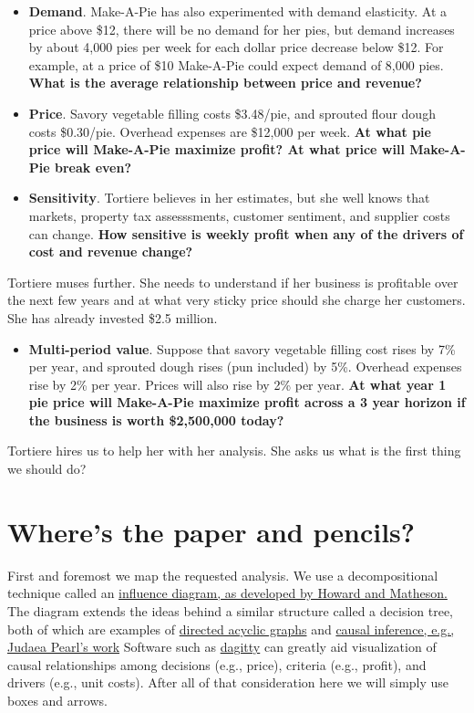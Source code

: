 \documentclass[
]{book}
\providecommand{\tightlist}{%
  \setlength{\itemsep}{0pt}\setlength{\parskip}{0pt}}
\begin{document}
\begin{itemize}
\item
  \textbf{Demand}. Make-A-Pie has also experimented with demand elasticity. At a price above \$12, there will be no demand for her pies, but demand increases by about 4,000 pies per week for each dollar price decrease below \$12. For example, at a price of \$10 Make-A-Pie could expect demand of 8,000 pies. \textbf{What is the average relationship between price and revenue?}
\item
  \textbf{Price}. Savory vegetable filling costs \$3.48/pie, and sprouted flour dough costs \$0.30/pie. Overhead expenses are \$12,000 per week. \textbf{At what pie price will Make-A-Pie maximize profit? At what price will Make-A-Pie break even?}
\item
  \textbf{Sensitivity}. Tortiere believes in her estimates, but she well knows that markets, property tax assesssments, customer sentiment, and supplier costs can change. \textbf{How sensitive is weekly profit when any of the drivers of cost and revenue change?}
\end{itemize}

Tortiere muses further. She needs to understand if her business is profitable over the next few years and at what very sticky price should she charge her customers. She has already invested \$2.5 million.

\begin{itemize}
\tightlist
\item
  \textbf{Multi-period value}. Suppose that savory vegetable filling cost rises by 7\% per year, and sprouted dough rises (pun included) by 5\%. Overhead expenses rise by 2\% per year. Prices will also rise by 2\% per year. \textbf{At what year 1 pie price will Make-A-Pie maximize profit across a 3 year horizon if the business is worth \$2,500,000 today?}
\end{itemize}

Tortiere hires us to help her with her analysis. She asks us what is the first thing we should do?

\hypertarget{wheres-the-paper-and-pencils}{%
\section{Where's the paper and pencils?}\label{wheres-the-paper-and-pencils}}

First and foremost we map the requested analysis. We use a decompositional technique called an \href{http://www.cs.ru.nl/~marinav/Teaching/BDMinAI/influencediagrams05.pdf}{influence diagram, as developed by Howard and Matheson.} The diagram extends the ideas behind a similar structure called a decision tree, both of which are examples of \href{https://en.wikipedia.org/wiki/Directed_acyclic_graph}{directed acyclic graphs} and \href{https://escholarship.org/uc/item/6gv9n38c}{causal inference, e.g., Judaea Pearl's work} Software such as \href{http://www.dagitty.net/}{dagitty} can greatly aid visualization of causal relationships among decisions (e.g., price), criteria (e.g., profit), and drivers (e.g., unit costs). After all of that consideration here we will simply use boxes and arrows.
\end{document}
